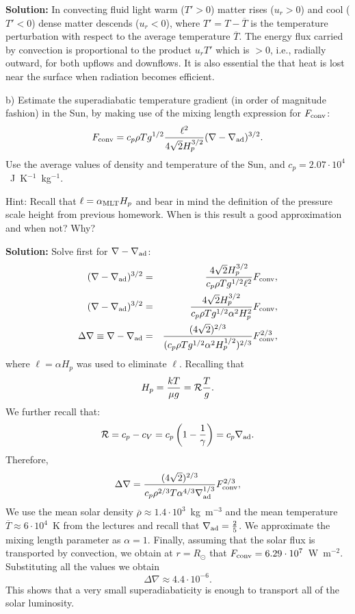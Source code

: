\documentclass[12pt]{article}
\newcommand{\Fconv}{F_{\rm conv}}
\begin{document}
{\bf Solution:} In convecting fluid light warm ($T' > 0$) matter rises
($u_r > 0$) and cool ($T'<0$) dense matter descends ($u_r < 0$), where
$T' = T - \overline{T}$ is the temperature perturbation with respect
to the average temperature $\overline{T}$. The energy flux carried by
convection is proportional to the product $u_r T'$ which is $>0$,
i.e., radially outward, for both upflows and downflows. It is also
essential the that heat is lost near the surface when radiation
becomes efficient.


b) Estimate the superadiabatic temperature gradient (in order of
magnitude fashion) in the Sun, by making use of the mixing length
expression for $\Fconv$:
\begin{equation}
  \Fconv = c_p \rho T g^{1/2} \frac{\ell^2}{4\sqrt{2}H_p^{3/2}} (\nabla-\nabla_{\rm ad})^{3/2}.
\end{equation}
Use the average values of density and temperature of the Sun, and $c_p
= 2.07\cdot10^4$~J~K$^{-1}$~kg$^{-1}$. 

Hint: Recall that $\ell =
\alpha_{\rm MLT}H_p$ and bear in mind the definition of the pressure
scale height from previous homework. When is this result a good
approximation and when not? Why?

{\bf Solution:} Solve first for $\nabla-\nabla_{\rm ad}$:
\begin{eqnarray}
(\nabla-\nabla_{\rm ad})^{3/2} &=&  \frac{4\sqrt{2} H_p^{3/2}}{c_p \rho T g^{1/2} \ell^2} \Fconv,\\
(\nabla-\nabla_{\rm ad})^{3/2} &=&  \frac{4\sqrt{2} H_p^{3/2}}{c_p \rho T g^{1/2} \alpha^2 H_p^2} \Fconv,\\
\Delta\nabla \equiv \nabla-\nabla_{\rm ad} &=& \frac{(4\sqrt{2})^{2/3}}{(c_p \rho T g^{1/2} \alpha^2 H_p^{1/2})^{2/3}} \Fconv^{2/3},
\end{eqnarray}
where $\ell = \alpha H_p$ was used to eliminate $\ell$. Recalling that
\begin{equation}
H_p = \frac{kT}{\mu g} = {\cal R} \frac{T}{g}.
\end{equation}
We further recall that:
\begin{equation}
{\cal R} = c_p - c_V = c_p \left( 1 - \frac{1}{\gamma} \right) = c_p \nabla_{\rm ad}.
\end{equation}
Therefore,
\begin{eqnarray}
\Delta\nabla = \frac{(4\sqrt{2})^{2/3}}{c_p \rho^{2/3} T \alpha^{4/3} \nabla_{\rm ad}^{1/3}} \Fconv^{2/3},
\end{eqnarray}
We use the mean solar density $\overline{\rho} \approx 1.4\cdot
10^3$~kg~m$^{-3}$ and the mean temperature $\overline{T} \approx
6\cdot 10^4 $~K from the lectures and recall that $\nabla_{\rm ad} =
{2 \over 5}$. We approximate the mixing length parameter as
$\alpha=1$. Finally, assuming that the solar flux is transported by
convection, we obtain at $r=R_\odot$ that $\Fconv = 6.29 \cdot
10^7$~W~m$^{-2}$. Substituting all the values we obtain
\begin{equation}
\Delta \nabla \approx 4.4 \cdot 10^{-6}.
\end{equation}
This shows that a very small superadiabaticity is enough to transport
all of the solar luminosity.
\end{document}
